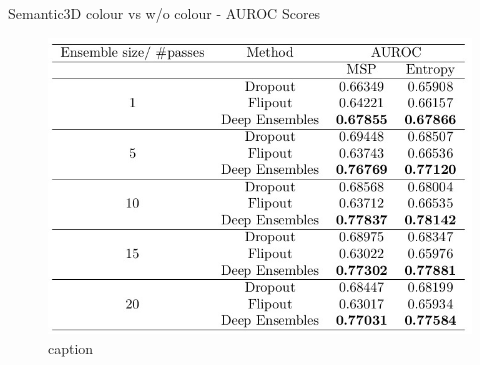 \documentclass[aspectratio=169]{beamer}
\begin{document}
\begin{frame}{Semantic3D colour vs w/o colour - AUROC Scores}
    \begin{figure}
        \centering
        \includegraphics[scale=0.35]{images/ood2/AUROC_OOD2.jpg}
        \caption{caption}
         \label{fig:auroc_scores_ood2}
    \end{figure}
\end{frame}

\end{document}
